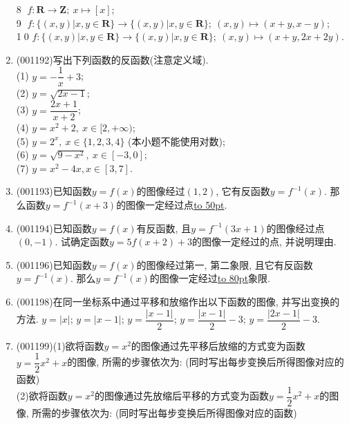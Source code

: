 \documentclass[10pt,a4paper]{article}
\newcommand{\blank}[1]{\underline{\hbox to #1pt{}}}
\begin{document}
\begin{enumerate}[1.]
\textcircled{8} $f: \mathbf{R}\rightarrow \mathbf{Z}; \ x \mapsto [x]$;\\ 
\textcircled{9} $f: \{(x,y)|x,y\in \mathbf{R}\}\rightarrow \{(x,y)|x,y\in \mathbf{R}\};\ (x,y)\mapsto (x+y,x-y)$;\\ 
\textcircled{10} $f: \{(x,y)|x,y\in \mathbf{R}\}\rightarrow \{(x,y)|x,y\in \mathbf{R}\};\ (x,y)\mapsto (x+y,2x+2y)$.
\item {\tiny (001192)}写出下列函数的反函数(注意定义域).\\ 
(1) $y=-\dfrac{1}{x}+3$;\\ 
(2) $y=\sqrt{2x-1}$;\\ 
(3) $y=\dfrac{2x+1}{x+2}$;\\ 
(4) $y=x^2+2, \ x\in [2,+\infty)$;\\ 
(5) $y=2^x, \ x\in \{1,2,3,4\}$ (本小题不能使用对数);\\ 
(6) $y=\sqrt{9-x^2}, \ x\in [-3,0]$;\\ 
(7) $y=x^2-4x, x \in [3,7]$.
\item {\tiny (001193)}已知函数$y=f(x)$的图像经过$(1,2)$, 它有反函数$y=f^{-1}(x)$. 那么函数$y=f^{-1}(x+3)$的图像一定经过点\blank{50}.
\item {\tiny (001194)}已知函数$y=f(x)$有反函数, 且$y=f^{-1}(3x+1)$的图像经过点$(0,-1)$. 试确定函数$y=5f(x+2)+3$的图像一定经过的点, 并说明理由.
\item {\tiny (001196)}已知函数$y=f(x)$的图像经过第一, 第二象限, 且它有反函数$y=f^{-1}(x)$. 那么$y=f^{-1}(x)$的图像一定经过\blank{80}象限.
\item {\tiny (001198)}在同一坐标系中通过平移和放缩作出以下函数的图像, 并写出变换的方法.
$y=|x|$; $y=|x-1|$; $y=\dfrac{|x-1|}2$; $y=\dfrac{|x-1|}2-3$; $y=\dfrac{|2x-1|}2-3$.
\begin{center}
\end{center}
\item {\tiny (001199)}(1)欲将函数$y=x^2$的图像通过先平移后放缩的方式变为函数$y=\dfrac{1}{2}x^2+x$的图像, 所需的步骤依次为: (同时写出每步变换后所得图像对应的函数)\\ 
(2)欲将函数$y=x^2$的图像通过先放缩后平移的方式变为函数$y=\dfrac{1}{2}x^2+x$的图像, 所需的步骤依次为: (同时写出每步变换后所得图像对应的函数)

\end{enumerate}
\end{document}
